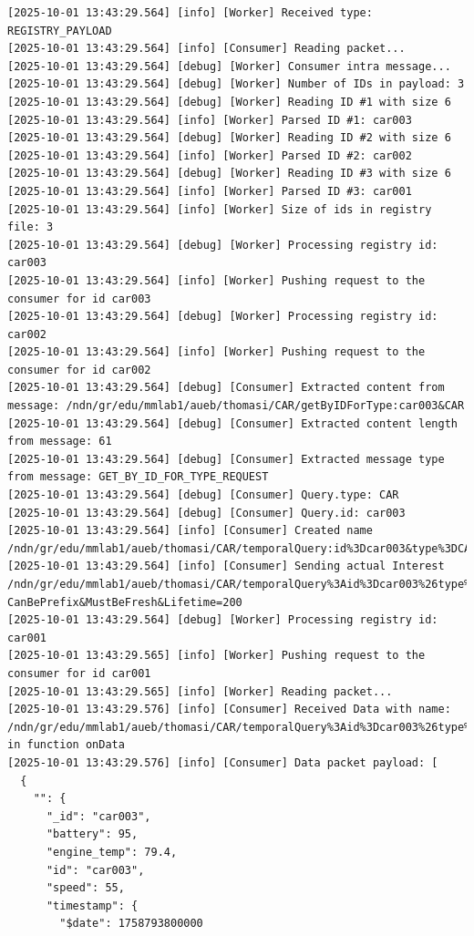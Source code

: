 \documentclass{article}
\begin{document}
\begin{lstlisting}[language=log, caption={\emph{MMLab2} after receive a response for its \emph{GET by TYPE} request for \textit{@type=CAR}}, label={lst:response-from-get-by-type}]
[2025-10-01 13:43:29.564] [info] [Worker] Received type: REGISTRY_PAYLOAD
[2025-10-01 13:43:29.564] [info] [Consumer] Reading packet...
[2025-10-01 13:43:29.564] [debug] [Worker] Consumer intra message...
[2025-10-01 13:43:29.564] [debug] [Worker] Number of IDs in payload: 3
[2025-10-01 13:43:29.564] [debug] [Worker] Reading ID #1 with size 6
[2025-10-01 13:43:29.564] [info] [Worker] Parsed ID #1: car003
[2025-10-01 13:43:29.564] [debug] [Worker] Reading ID #2 with size 6
[2025-10-01 13:43:29.564] [info] [Worker] Parsed ID #2: car002
[2025-10-01 13:43:29.564] [debug] [Worker] Reading ID #3 with size 6
[2025-10-01 13:43:29.564] [info] [Worker] Parsed ID #3: car001
[2025-10-01 13:43:29.564] [info] [Worker] Size of ids in registry file: 3
[2025-10-01 13:43:29.564] [debug] [Worker] Processing registry id: car003
[2025-10-01 13:43:29.564] [info] [Worker] Pushing request to the consumer for id car003
[2025-10-01 13:43:29.564] [debug] [Worker] Processing registry id: car002
[2025-10-01 13:43:29.564] [info] [Worker] Pushing request to the consumer for id car002
[2025-10-01 13:43:29.564] [debug] [Consumer] Extracted content from message: /ndn/gr/edu/mmlab1/aueb/thomasi/CAR/getByIDForType:car003&CAR
[2025-10-01 13:43:29.564] [debug] [Consumer] Extracted content length from message: 61
[2025-10-01 13:43:29.564] [debug] [Consumer] Extracted message type from message: GET_BY_ID_FOR_TYPE_REQUEST
[2025-10-01 13:43:29.564] [debug] [Consumer] Query.type: CAR
[2025-10-01 13:43:29.564] [debug] [Consumer] Query.id: car003
[2025-10-01 13:43:29.564] [info] [Consumer] Created name /ndn/gr/edu/mmlab1/aueb/thomasi/CAR/temporalQuery:id%3Dcar003&type%3DCAR&date%3D&count%3D&timeframe%3D&filters%3D
[2025-10-01 13:43:29.564] [info] [Consumer] Sending actual Interest /ndn/gr/edu/mmlab1/aueb/thomasi/CAR/temporalQuery%3Aid%3Dcar003%26type%3DCAR%26date%3D%26count%3D%26timeframe%3D%26filters%3D?CanBePrefix&MustBeFresh&Lifetime=200
[2025-10-01 13:43:29.564] [debug] [Worker] Processing registry id: car001
[2025-10-01 13:43:29.565] [info] [Worker] Pushing request to the consumer for id car001
[2025-10-01 13:43:29.565] [info] [Worker] Reading packet...
[2025-10-01 13:43:29.576] [info] [Consumer] Received Data with name: /ndn/gr/edu/mmlab1/aueb/thomasi/CAR/temporalQuery%3Aid%3Dcar003%26type%3DCAR%26date%3D%26count%3D%26timeframe%3D%26filters%3D in function onData
[2025-10-01 13:43:29.576] [info] [Consumer] Data packet payload: [
  {
    "": {
      "_id": "car003",
      "battery": 95,
      "engine_temp": 79.4,
      "id": "car003",
      "speed": 55,
      "timestamp": {
        "$date": 1758793800000

\end{lstlisting}
\end{document}
